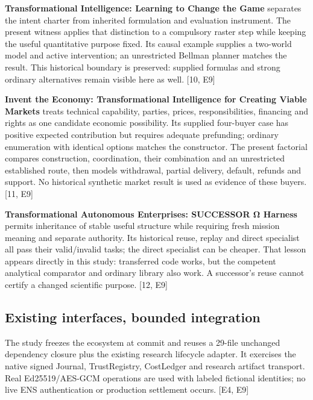 \documentclass[10pt,a4paper]{article}
\begin{document}
\textbf{Transformational Intelligence: Learning to Change the Game}
separates the intent charter from inherited formulation and evaluation
instrument. The present witness applies that distinction to a compulsory
raster step while keeping the useful quantitative purpose fixed. Its
causal example supplies a two-world model and active intervention; an
unrestricted Bellman planner matches the result. This historical
boundary is preserved: supplied formulas and strong ordinary
alternatives remain visible here as well. {[}10, E9{]}

\textbf{Invent the Economy: Transformational Intelligence for Creating
Viable Markets} treats technical capability, parties, prices,
responsibilities, financing and rights as one candidate economic
possibility. Its supplied four-buyer case has positive expected
contribution but requires adequate prefunding; ordinary enumeration with
identical options matches the constructor. The present factorial
compares construction, coordination, their combination and an
unrestricted established route, then models withdrawal, partial
delivery, default, refunds and support. No historical synthetic market
result is used as evidence of these buyers. {[}11, E9{]}

\textbf{Transformational Autonomous Enterprises: SUCCESSOR Ω Harness}
permits inheritance of stable useful structure while requiring fresh
mission meaning and separate authority. Its historical reuse, replay and
direct specialist all pass their valid/invalid tasks; the direct
specialist can be cheaper. That lesson appears directly in this study:
transferred code works, but the competent analytical comparator and
ordinary library also work. A successor's reuse cannot certify a changed
scientific purpose. {[}12, E9{]}

\hypertarget{existing-interfaces-bounded-integration}{%
\subsection{Existing interfaces, bounded
integration}\label{existing-interfaces-bounded-integration}}

The study freezes the ecosystem at commit
 and reuses a 29-file
unchanged dependency closure plus the existing research lifecycle
adapter. It exercises the native signed Journal, TrustRegistry,
CostLedger and research artifact transport. Real Ed25519/AES-GCM
operations are used with labeled fictional identities; no live ENS
authentication or production settlement occurs. {[}E4, E9{]}
\end{document}
